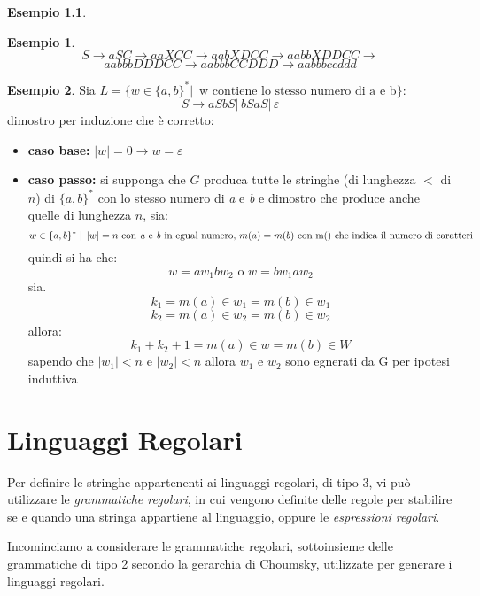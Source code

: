 \documentclass[a4paper]{book}
\theoremstyle{definition}%
\newtheorem*{esempio}{Esempio}
\begin{document}
\begin{esempio}
\begin{esempio}
$$S\to aSC\to aaXCC\to aabXDCC\to aabbXDDCC\to $$
$$aabbbDDDCC\to aabbbCCDDD\to aabbbccddd$$
\end{esempio}
\begin{esempio}
Sia $L=\{w\in\{a,b\}^*|\, \mbox{ w contiene lo stesso numero di a e b}\}$:
$$S\to aSbS|\,bSaS|\, \varepsilon$$
dimostro per induzione che è corretto:
\begin{itemize}
\item \textbf{caso base:} $|w|=0\to w=\varepsilon$
\item \textbf{caso passo:} si supponga che $G$ produca tutte le stringhe (di lunghezza $<$ di $n$) di $\{a,b\}^*$ con lo stesso numero di \textit{a} e \textit{b} e dimostro che produce anche quelle di lunghezza $n$, sia:
$$w\in \{a,b\}^* \mid\, |w|=n \mbox{ con\textit{ a} e \textit{b} in egual numero, }m(a)=m(b) \mbox{ con m() che indica il numero di caratteri}$$
quindi si ha che:
$$w=aw_1bw_2\mbox{ o } w=bw_1aw_2$$
sia.
$$k_1=m(a)\in w_1=m(b)\in w_1$$
$$k_2=m(a)\in w_2=m(b)\in w_2$$
allora:
$$k_1+k_2+1=m(a)\in w= m(b)\in W$$
sapendo che $|w_1|<n$ e $|w_2|<n$ allora $w_1$ e $w_2$ sono egnerati da G per ipotesi induttiva
\end{itemize}
\end{esempio}

\chapter{Linguaggi Regolari}
  Per definire le stringhe appartenenti ai linguaggi regolari, di tipo 3, vi può utilizzare le \emph{grammatiche regolari},
  in cui vengono definite delle regole per stabilire se e quando una stringa appartiene al linguaggio, oppure le \emph{espressioni regolari}.
  
  Incominciamo a considerare le grammatiche regolari, sottoinsieme delle grammatiche di tipo 2 secondo la gerarchia di Choumsky,
  utilizzate per generare i linguaggi regolari.
  

\end{esempio}
\end{document}
